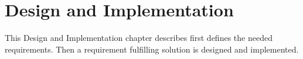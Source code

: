 \section{Design and Implementation}
\label{sec:designandimplementation}
This Design and Implementation chapter describes first defines the needed requirements. Then a requirement fulfilling solution is designed and implemented.


